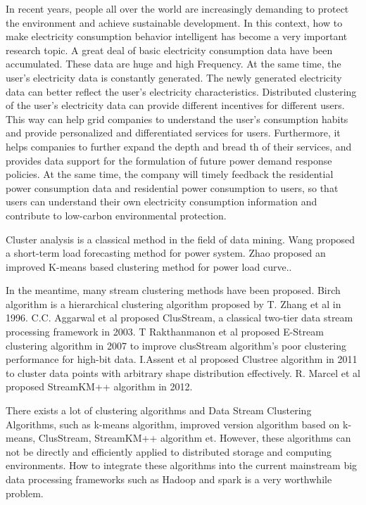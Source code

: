 \documentclass[runningheads]{llncs}
\begin{document}
 In recent years, people all over the world are increasingly demanding to protect the environment and achieve sustainable development. In this context, how to make electricity consumption behavior intelligent has become a very important research topic. A great deal of basic electricity consumption data have been accumulated\cite{muchData}. These data are huge and high Frequency. At the same time, the user's electricity data is constantly generated. The newly generated electricity data can better reflect the user's electricity characteristics. Distributed clustering of the user's electricity data can provide different incentives for different users. This way can help grid companies to understand the user's consumption habits and provide personalized and differentiated services for users. Furthermore, it helps companies to further expand the depth and bread th of their services, and provides data support for the formulation of future power demand response policies. At the same time, the company will timely feedback the residential power consumption data and residential power consumption to users, so that users can understand their own electricity consumption information and contribute to low-carbon environmental protection.
 
 Cluster analysis is a classical method in the field of data mining. Wang\cite{wang} proposed a short-term load forecasting method for power system. Zhao\cite{zhao} proposed an improved K-means based clustering method for power load curve..
 
 In the meantime, many stream clustering methods have been proposed. Birch\cite{birch} algorithm is a hierarchical clustering algorithm proposed by T. Zhang et al in 1996. C.C. Aggarwal et al proposed ClusStream\cite{clusStream}, a classical two-tier data stream processing framework in 2003. T Rakthanmanon et al proposed E-Stream\cite{E-stream} clustering algorithm in 2007 to improve clusStream algorithm's poor clustering performance for high-bit data. I.Assent et al\cite{clusTree} proposed Clustree algorithm in 2011 to cluster data points with arbitrary shape distribution effectively. R. Marcel et al proposed StreamKM++ algorithm\cite{streamKM} in 2012.
 
 There exists a lot of clustering algorithms and Data Stream Clustering Algorithms, such as k-means\cite{kmeans} algorithm, improved version algorithm based on k-means, ClusStream,  StreamKM++ algorithm et. However, these algorithms can not be directly and efficiently applied to distributed storage and computing environments. How to integrate these algorithms into the current mainstream big data processing frameworks such as Hadoop and spark is a very worthwhile problem.
 
\end{document}
